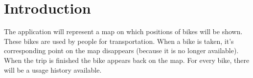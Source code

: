 \section{Introduction}

The application will represent a map on which positions of bikes will be shown. These bikes are used by people
for transportation. When a bike is taken, it’s corresponding point on the map disappears (because it is no longer available). When the trip is finished the bike appears back on the map. For every bike, there will be a usage history available.